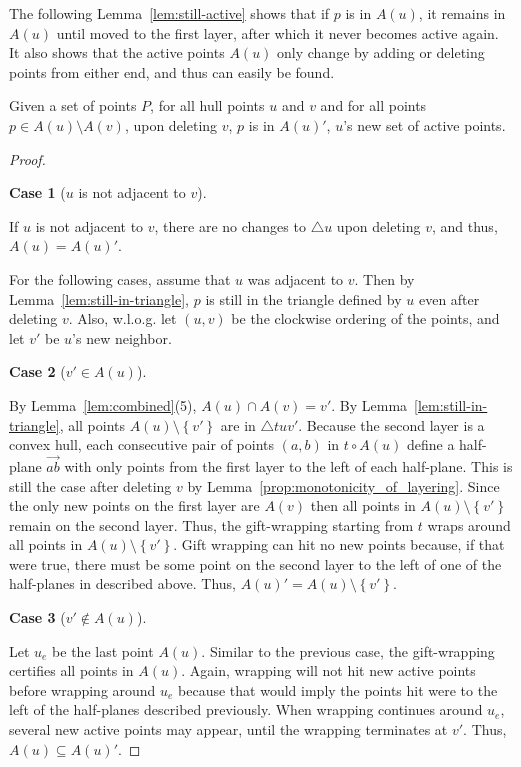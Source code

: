 \documentclass{cccg24}
\newcommand{\lrCurlyBrackets}[1]{\left\{ #1 \right\}}
\newcommand{\Tri}[3]{\triangle #1#2#3}
\newcommand{\TriS}[1]{\triangle #1}
\newcommand{\hp}[1]{\overrightarrow{#1}}
\newtheorem{case}{Case}
\begin{document}
The following Lemma~\ref{lem:still-active} shows that if $p$ is in $A(u)$, it remains in $A(u)$ until moved to the first layer, after which it never becomes active again. 
It also shows that the active points $A(u)$ only change by adding or deleting points from either end, and thus can easily be found.
\begin{lemma}\label{lem:still-active}
    Given a set of points $P$, for all hull points $u$ and $v$ and for all points $p \in A(u) \setminus A(v)$, upon deleting $v$, $p$ is in $A(u)'$, $u$'s new set of active points.
\end{lemma}
\begin{proof}$ $\newline

    \begin{case}[$u$ is not adjacent to $v$]\label{case:u-and-v-not-adj}
    \end{case}
    If $u$ is not adjacent to $v$, there are no changes to $\TriS{u}$ upon deleting $v$, and thus, $A(u) = A(u)'$. 
    
    For the following cases, assume that $u$ was adjacent to $v$. Then by Lemma~\ref{lem:still-in-triangle}, $p$ is still in the triangle defined by $u$ even after deleting $v$. Also, w.l.o.g. let $(u, v)$ be the clockwise ordering of the points, and let $v'$ be $u$'s new neighbor.
    

    \begin{case}[$v' \in A(u)$]\label{case:v'-in-A(u)}  
    \end{case}
    By Lemma~\ref{lem:combined}(5), $A(u) \cap A(v) = v'$.
    By Lemma~\ref{lem:still-in-triangle}, all points $A(u) \setminus \lrCurlyBrackets{v'}$ are in $\Tri{t}{u}{v'}$. 
    Because the second layer is a convex hull, each consecutive pair of points $(a,b)$ in $t \circ A(u)$ define a half-plane $\hp{ab}$ with only points from the first layer to the left of each half-plane. 
    This is still the case after deleting $v$ by Lemma~\ref{prop:monotonicity_of_layering}. 
    Since the only new points on the first layer are $A(v)$ then all points in $A(u) \setminus \lrCurlyBrackets{v'}$ remain on the second layer. 
    Thus, the gift-wrapping starting from $t$ wraps around all points in $A(u) \setminus \lrCurlyBrackets{v'}$. 
    Gift wrapping can hit no new points because, if that were true, there must be some point on the second layer to the left of one of the half-planes in described above.
    Thus, $A(u)' = A(u) \setminus \lrCurlyBrackets{v'}$.

    \begin{case}[$v' \notin A(u)$]\label{case:v'-not-A(u)}    
    \end{case}
    Let $u_e$ be the last point $A(u)$.
    Similar to the previous case, the gift-wrapping certifies all points in $A(u)$. 
    Again, wrapping will not hit new active points before wrapping around $u_e$ because that would imply the points hit were to the left of the half-planes described previously. 
    When wrapping continues around $u_e$, several new active points may appear, until the wrapping terminates at $v'$. Thus, $A(u) \subseteq A(u)'$.
\end{proof}
\end{document}

